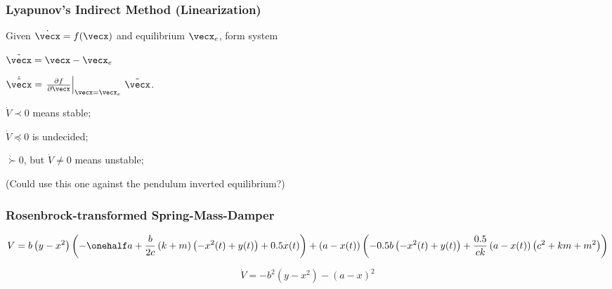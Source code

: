 \documentclass[12pt]{beamer}
\begin{document}
\begin{frame}
\frametitle{Lyapunov's Indirect Method (Linearization)}

Given $\dot \vecx = f(\vecx)$ and equilibrium $\vecx_e$,
form system

$\tilde\vecx = \vecx - \vecx_e$

$\dot{\tilde\vecx}
	= \left.
		\frac{\partial f }{\partial\vecx} \right|_{\vecx=\vecx_e}
		\, \tilde\vecx$.



$\dot V \prec 0$ means stable;

$\dot V \preceq 0$ is undecided;

$\dot \succ 0$, but $\dot V \neq 0$ means unstable;

(Could use this one against the pendulum inverted equilibrium?)

\end{frame}







\begin{frame}
\frametitle{Rosenbrock-transformed Spring-Mass-Damper}

\begin{equation}
V = b \left( y - x^{2}\right)
	\left(
		-\onehalf a + \frac{b}{2c} \left(k + m\right) \left(- x^{2}{\left (t \right )} + y{\left (t \right )}\right) + 0.5 x{\left (t \right )}\right)
		+ \left(a - x{\left (t \right )}\right) \left(- 0.5 b \left(- x^{2}{\left (t \right )} + y{\left (t \right )}\right) + \frac{0.5}{c k} \left(a - x{\left (t \right )}\right) \left(c^{2} + k m + m^{2}\right)\right)
\end{equation}

\begin{equation}
\dot V = -b^2 \left( y - x^2 \right) - \left( a - x \right)^2
\end{equation}

\end{frame}
\end{document}
